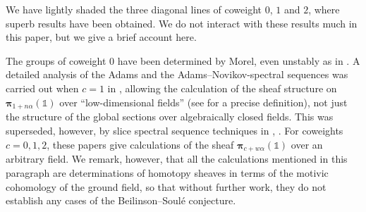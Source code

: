 \documentclass[11pt, oneside, dvipsnames, svgnames, table, final]{amsart}
\theoremstyle{plain}
\theoremstyle{definition}
\theoremstyle{remark}
\newcommand{\bpi}{\bm{\pi}}
\newcommand{\<}[1]{{\langle}#1 {\rangle}}
\newcommand{\one}{\mathbb{1}}
\begin{document}
We have lightly shaded the three diagonal lines of coweight $0$, $1$ and $2$, where superb results have been obtained. We do not interact with these results much in this paper, but we give a brief account here.

The groups of coweight $0$ have been determined by Morel, even unstably as in \cite[Cor.~6.43]{Morel2012}. A detailed analysis of the Adams and the Adams--Novikov-spectral sequences was carried out when $c=1$ in \cite{Ormsby2014}, allowing the calculation of the sheaf structure on $\bpi_{1+n\alpha}(\one)$ over ``low-dimensional fields'' (see \cite{Ormsby2014} for a precise definition), not just the structure of the global sections over algebraically closed fields. This was superseded, however, by slice spectral sequence techniques in \cite{Rondigs2019}, \cite{Rondigs2024}. For coweights $c=0,1,2$, these papers give calculations of the sheaf $\bpi_{c + w\alpha}(\one)$ over an arbitrary field. We remark, however, that all the calculations mentioned in this paragraph are determinations of homotopy sheaves in terms of the motivic cohomology of the ground field, so that without further work, they do not establish any cases of the Beilinson--Soulé conjecture.
\end{document}
